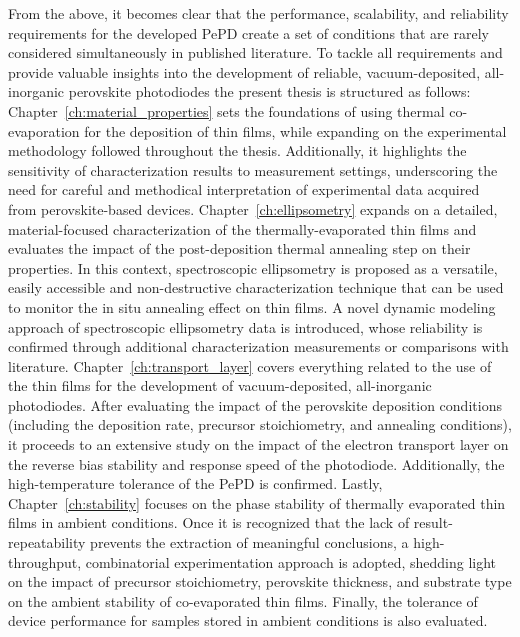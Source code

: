 From the above, it becomes clear that the performance, scalability, and reliability requirements for the developed PePD create a set of conditions that are rarely considered simultaneously in published literature. To tackle all requirements and provide valuable insights into the development of reliable, vacuum-deposited, all-inorganic perovskite photodiodes the present thesis is structured as follows:  Chapter~\ref{ch:material_properties} sets the foundations of using thermal co-evaporation for the deposition of  thin films, while expanding on the experimental methodology followed throughout the thesis. Additionally, it highlights the sensitivity of characterization results to measurement settings, underscoring the need for careful and methodical interpretation of experimental data acquired from perovskite-based devices. Chapter~\ref{ch:ellipsometry} expands on a detailed, material-focused characterization of the thermally-evaporated  thin films and evaluates the impact of the post-deposition thermal annealing step on their properties. In this context, spectroscopic ellipsometry is proposed as a versatile, easily accessible and non-destructive characterization technique that can be used to monitor the in situ annealing effect on  thin films. A novel dynamic modeling approach of spectroscopic ellipsometry data is introduced, whose reliability is confirmed through additional characterization measurements or comparisons with literature. Chapter~\ref{ch:transport_layer} covers everything related to the use of the  thin films for the development of vacuum-deposited, all-inorganic photodiodes. After evaluating the impact of the perovskite deposition conditions (including the deposition rate, precursor stoichiometry, and annealing conditions), it proceeds to an extensive study on the impact of the electron transport layer on the reverse bias stability and response speed of the photodiode. Additionally, the high-temperature tolerance of the PePD is confirmed. Lastly, Chapter~\ref{ch:stability} focuses on the phase stability of thermally evaporated  thin films in ambient conditions. Once it is recognized that the lack of result-repeatability prevents the extraction of meaningful conclusions, a high-throughput, combinatorial experimentation approach is adopted, shedding light on the impact of precursor stoichiometry, perovskite thickness, and substrate type on the ambient stability of co-evaporated  thin films. Finally, the tolerance of device performance for samples stored in ambient conditions is also evaluated. 





\cleardoublepage

